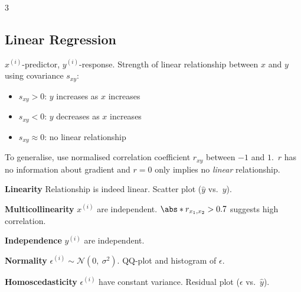 \documentclass{article}
\begin{document}
\begin{multicols}{3}
    \subsection{Linear Regression}
    \(x^{\left( i \right)}\)-predictor, \(y^{\left( i \right)}\)-response.
    Strength of linear relationship between \(x\) and \(y\) using
    covariance \(s_{xy}\):
    \begin{itemize}
        \item \(s_{xy} > 0\): \(y\) increases as \(x\) increases
        \item \(s_{xy} < 0\): \(y\) decreases as \(x\) increases
        \item \(s_{xy} \approx 0\): no linear relationship
    \end{itemize}
    To generalise, use normalised correlation coefficient \(r_{xy}\) between
    \(-1\) and \(1\).\ \(r\) has no information about gradient and \(r = 0\)
    only implies no \textit{linear} relationship.

    \textbf{Linearity} Relationship is indeed linear.
    Scatter plot (\(\hat{y}\) vs.\ \(y\)).

    \textbf{Multicollinearity} \(x^{\left( i \right)}\) are independent.
    \(\abs*{r_{x_1,x_2}} > 0.7\) suggests high correlation.

    \textbf{Independence} \(y^{\left( i \right)}\) are independent.

    \textbf{Normality} \(\epsilon^{\left( i \right)} \sim \mathcal{N}\left( 0,\: \sigma^2 \right)\).
    QQ-plot and histogram of \(\epsilon\).

    \textbf{Homoscedasticity} \(\epsilon^{\left( i \right)}\) have constant variance.
    Residual plot (\(\epsilon\) vs.\ \(\hat{y}\)).


\end{multicols}
\end{document}
